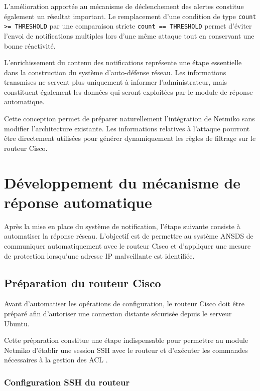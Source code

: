 L'amélioration apportée au mécanisme de déclenchement des alertes constitue également un résultat important. Le remplacement d'une condition de type \texttt{count >= THRESHOLD} par une comparaison stricte \texttt{count == THRESHOLD} permet d'éviter l'envoi de notifications multiples lors d'une même attaque tout en conservant une bonne réactivité.

L'enrichissement du contenu des notifications représente une étape essentielle dans la construction du système d'auto-défense réseau. Les informations transmises ne servent plus uniquement à informer l'administrateur, mais constituent également les données qui seront exploitées par le module de réponse automatique.

Cette conception permet de préparer naturellement l'intégration de Netmiko sans modifier l'architecture existante. Les informations relatives à l'attaque pourront être directement utilisées pour générer dynamiquement les règles de filtrage sur le routeur Cisco.

\section{Développement du mécanisme de réponse automatique}

Après la mise en place du système de notification, l'étape suivante consiste à automatiser la réponse réseau. L'objectif est de permettre au système ANSDS de communiquer automatiquement avec le routeur Cisco et d'appliquer une mesure de protection lorsqu'une adresse IP malveillante est identifiée.

\subsection{Préparation du routeur Cisco}

Avant d'automatiser les opérations de configuration, le routeur Cisco doit être préparé afin d'autoriser une connexion distante sécurisée depuis le serveur Ubuntu.

Cette préparation constitue une étape indispensable pour permettre au module Netmiko d'établir une session SSH avec le routeur et d'exécuter les commandes nécessaires à la gestion des ACL \cite{netmiko_docs,cisco_ios}.

\subsubsection{Configuration SSH du routeur}

